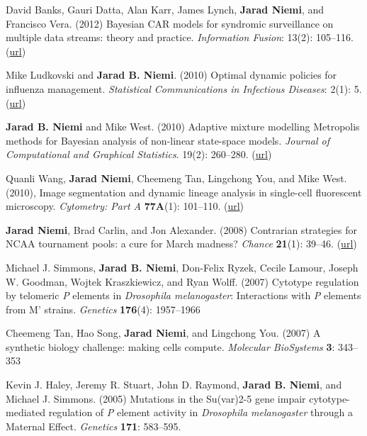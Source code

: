\documentclass[overlapped,line]{res}
\newcommand{\sinceappt}{}
\begin{document}
\begin{resume}
\sinceappt

David Banks, Gauri Datta, Alan Karr, James Lynch, {\bf Jarad Niemi}, and Francisco Vera. (2012) Bayesian CAR models for syndromic surveillance on multiple data streams: theory and practice. \emph{Information Fusion}: 13(2): 105--116. (\href{http://www.sciencedirect.com/science/article/pii/S156625350900092X}{url})

Mike Ludkovski and {\bf Jarad B. Niemi}. (2010) Optimal dynamic policies for influenza management. \emph{Statistical Communications in Infectious Diseases}: 2(1): 5. (\href{http://www.degruyter.com/view/j/scid.2010.2.1/scid.2010.2.1.1020/scid.2010.2.1.1020.xml}{url})

{\bf Jarad B. Niemi} and Mike West. (2010) Adaptive mixture modelling Metropolis methods for Bayesian analysis of non-linear state-space models. \emph{Journal of Computational and Graphical Statistics}. 19(2): 260--280. (\href{http://www.tandfonline.com/doi/abs/10.1198/jcgs.2010.08117}{url})

Quanli Wang, {\bf Jarad Niemi}, Cheemeng Tan, Lingchong You, and Mike West. (2010), Image segmentation and dynamic lineage analysis in single-cell fluorescent microscopy. \emph{Cytometry: Part A} {\bf 77A}(1): 101--110. (\href{http://onlinelibrary.wiley.com/doi/10.1002/cyto.a.20812/full}{url})

{\bf Jarad Niemi}, Brad Carlin, and Jon Alexander. (2008) Contrarian strategies for NCAA tournament pools: a cure for March madness? \emph{Chance} {\bf 21}(1): 39--46. (\href{http://amstat.tandfonline.com/doi/pdf/10.1080/09332480.2008.10722884}{url})


Michael J. Simmons, {\bf Jarad B. Niemi}, Don-Felix Ryzek, Cecile Lamour, Joseph W. Goodman, Wojtek Kraszkiewicz, and Ryan Wolff. (2007) Cytotype regulation by telomeric \emph{P} elements in \emph{Drosophila melanogaster}: Interactions with \emph{P} elements from M' strains. \emph{Genetics} {\bf 176}(4): 1957--1966

Cheemeng Tan, Hao Song, {\bf Jarad Niemi}, and Lingchong You. (2007) A synthetic biology challenge: making cells compute. \emph{Molecular BioSystems}  {\bf 3}: 343--353

Kevin J. Haley, Jeremy R. Stuart, John D. Raymond, {\bf Jarad B. Niemi}, and Michael J. Simmons. (2005) Mutations in the Su(var)2-5 gene impair cytotype-mediated regulation of \emph{P} element activity in \emph{Drosophila melanogaster} through a Maternal Effect. \emph{Genetics} {\bf 171}: 583--595.



\end{resume}
\end{document}
